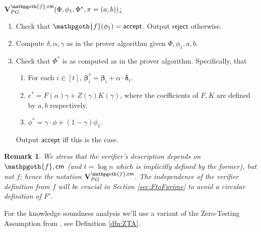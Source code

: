 \documentclass[11pt]{article} %
\newcommand{\cm}{\ensuremath{\mathsf{cm}}\xspace}
\newcommand{\rej}{\ensuremath{\mathsf{reject}}\xspace}
\newcommand{\accept}{\ensuremath{\mathsf{accept}}\xspace}
\newcommand{\prf}{\ensuremath{\mathsf{\pi}}\xspace}
\newcommand{\inst}{\ensuremath{\phi}\xspace}
\newcommand{\ver}{\ensuremath{\mathsf{\mathbf{V}}}\xspace}
\newcommand{\verpg}{\ensuremath{\ver^{\predinst,\cm}_{PG}}\xspace}
\newtheorem{remark}[lemma]{Remark}
\newcommand{\betaa}{\ensuremath{\mathbf{\boldsymbol{\beta}}}\xspace}
\newcommand{\deltaa}{\ensuremath{\mathbf{\boldsymbol{\delta}}}\xspace}
\newcommand{\instt}{\ensuremath{\Phi^*}\xspace}
\newcommand{\insttbase}{\ensuremath{\Phi}\xspace}
\newcommand{\predinst}{\ensuremath{\mathpgoth{f}}\xspace}
\begin{document}
\underline{$\verpg(\insttbase,\inst_1, \instt,\prf=(a,b))$:}
\begin{enumerate}
\item Check that $\predinst(\inst_1)=\accept$. Output \rej otherwise.
\item Compute $\delta,\alpha,\gamma$ as in the prover algorithm given $\insttbase,\inst_1,a,b$.
\item Check that $\instt$ is as computed as in the prover algorithm. Specifically, that
\begin{enumerate}
 \item For each $i\in [t]$, $\betaa^*_i= \betaa_i+\alpha\cdot \deltaa_i$.
 \item $ e^* = F(\alpha)\gamma + Z(\gamma)K(\gamma)$, where the coefficients of $F,K$ are defined by $a,b$ respectively.
 \item $ \inst^*= \gamma\cdot \inst + (1-\gamma) \inst_1$.
\end{enumerate}


Output \accept iff this is the case.
\end{enumerate}

\begin{remark}
 We stress that the verifier's description depends on $\predinst,\cm$ (and $t=\log n$ which is implicitly defined by the former), but not $f$; hence the notation \verpg.
 The independence of the verifier definition from $f$ will be crucial in Section \ref{sec:FtoFprime} to avoid a circular definition of $F'$.
\end{remark}



For the knowledge soundness analysis we'll use a variant of the Zero-Testing Assumption from \cite{novarecursive}, see Definition \ref{dfn:ZTA}.
\end{document}
